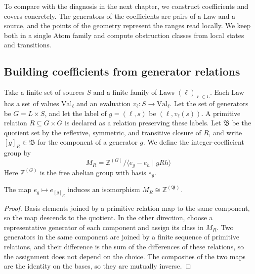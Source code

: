 To compare with the diagnosis in the next chapter, we construct coefficients and covers
concretely. The generators of the coefficients are pairs of a Law and a source, and the
points of the geometry represent the ranges read locally. We keep both in a single Atom
family and compute obstruction classes from local states and transitions.

\subsection*{Building coefficients from generator relations}

\begin{definition}\label{def:2.35}

Take a finite set of sources $S$ and a finite family of Laws $(\ell)_{\ell\in L}$. Each
Law has a set of values $\mathrm{Val}_\ell$ and an evaluation
$v_\ell:S\to\mathrm{Val}_\ell$. Let the set of generators be $G=L\times S$, and let the
label of $g=(\ell,s)$ be $(\ell,v_\ell(s))$. A primitive relation $R\subseteq G\times G$
is declared as a relation preserving these labels. Let $\mathfrak{B}$ be the quotient set
by the reflexive, symmetric, and transitive closure of $R$, and write
$[g]_R\in\mathfrak{B}$ for the component of a generator $g$. We define the
integer-coefficient group by
\begin{equation*}
M_R=\mathbb{Z}^{(G)}/\langle e_g-e_h\mid gRh\rangle
\tag{2.23}\label{eq:2.23}
\end{equation*}
Here $\mathbb{Z}^{(G)}$ is the free abelian group with basis $e_g$.

\end{definition}

\begin{lemma}\label{lem:2.36}

The map $e_g\mapsto e_{[g]_R}$ induces an isomorphism
$M_R\cong\mathbb{Z}^{(\mathfrak{B})}$.

\end{lemma}

\begin{proof}

Basis elements joined by a primitive relation map to the same component, so the map
descends to the quotient. In the other direction, choose a representative generator of
each component and assign its class in $M_R$. Two generators in the same component are
joined by a finite sequence of primitive relations, and their difference is the sum of
the differences of these relations, so the assignment does not depend on the choice. The
composites of the two maps are the identity on the bases, so they are mutually inverse.

\end{proof}

